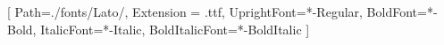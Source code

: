 \usepackage{hyphenat}
\usepackage{graphicx}
\usepackage{wallpaper} %
\usepackage{geometry} %
\usepackage{libertine}
\usepackage[most]{tcolorbox}
\usepackage{setspace}
\usepackage{parskip}
\usepackage{contour}
\usepackage{imakeidx}
\usepackage{ragged2e} %



\makeindex[intoc=true]
\onehalfspacing %
\setlength{\parskip}{1.5em}
\setlength\parindent{0pt}


\setmainfont{Lato}[
    Path=./fonts/Lato/,
    Extension = .ttf,
    UprightFont=*-Regular,
    BoldFont=*-Bold,
    ItalicFont=*-Italic,
    BoldItalicFont=*-BoldItalic
]